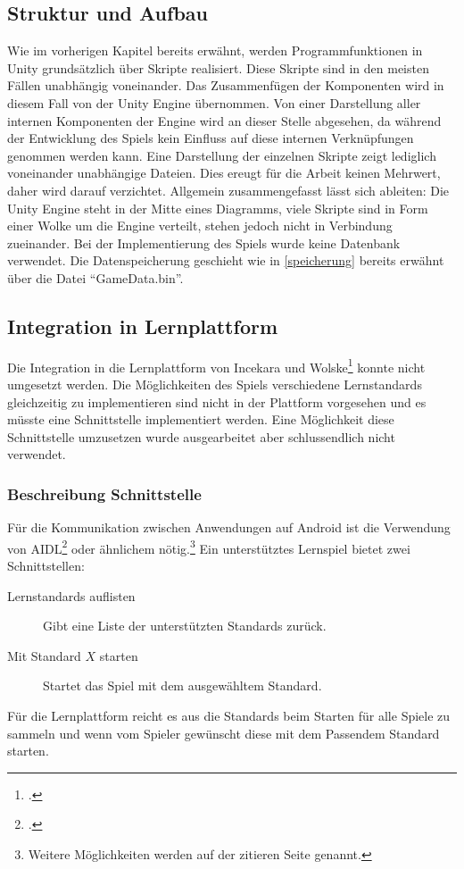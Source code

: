 \subsection{Struktur und Aufbau}
Wie im vorherigen Kapitel bereits erwähnt, werden Programmfunktionen in Unity grundsätzlich über Skripte realisiert. Diese Skripte sind in den meisten Fällen unabhängig voneinander. Das Zusammenfügen der Komponenten wird in diesem Fall von der Unity Engine übernommen. Von einer Darstellung aller internen Komponenten der Engine wird an dieser Stelle abgesehen, da während der Entwicklung des Spiels kein Einfluss auf diese internen Verknüpfungen genommen werden kann. Eine Darstellung der einzelnen Skripte zeigt lediglich voneinander unabhängige Dateien. Dies ereugt für die Arbeit keinen Mehrwert, daher wird darauf verzichtet. Allgemein zusammengefasst lässt sich ableiten: Die Unity Engine steht in der Mitte eines Diagramms, viele Skripte sind in Form einer Wolke um die Engine verteilt, stehen jedoch nicht in Verbindung zueinander.
Bei der Implementierung des Spiels wurde keine Datenbank verwendet. Die Datenspeicherung geschieht wie in \ref{speicherung} bereits erwähnt über die Datei \enquote{GameData.bin}.

\subsection{Integration in Lernplattform}
	Die Integration in die Lernplattform von Incekara und Wolske\footcite{lernplattform} konnte nicht umgesetzt werden. Die Möglichkeiten des Spiels verschiedene Lernstandards gleichzeitig zu implementieren sind nicht in der Plattform vorgesehen und es müsste eine Schnittstelle implementiert werden.
	Eine Möglichkeit diese Schnittstelle umzusetzen wurde ausgearbeitet aber schlussendlich nicht verwendet.
	\subsubsection*{Beschreibung Schnittstelle}
		Für die Kommunikation zwischen Anwendungen auf Android ist die Verwendung von AIDL\footcite{android-interfaces} oder ähnlichem nötig.\footnote{Weitere Möglichkeiten werden auf der zitieren Seite genannt.}
		Ein unterstütztes Lernspiel bietet zwei Schnittstellen:
		\begin{description}
			\item[Lernstandards auflisten]{
				Gibt eine Liste der unterstützten Standards zurück.
			}
			\item[Mit Standard $X$ starten]{
				Startet das Spiel mit dem ausgewähltem Standard.
			}
		\end{description}
		Für die Lernplattform reicht es aus die Standards beim Starten für alle Spiele zu sammeln und wenn vom Spieler gewünscht diese mit dem Passendem Standard starten.
